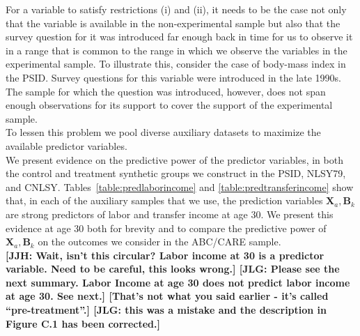 \noindent For a variable to satisfy restrictions (i) and (ii), it needs to be the case not only that the variable is available in the non-experimental sample but also that the survey question for it was introduced far enough back in time for us to observe it in a range that is common to the range in which we observe the variables in the experimental sample. To illustrate this, consider the case of body-mass index in the PSID. Survey questions for this variable were introduced in the late 1990s. The sample for which the question was introduced, however, does not span enough observations for its support to cover the support of the experimental sample.\\

\noindent To lessen this problem we pool diverse auxiliary datasets to maximize the available predictor variables.\\

\noindent We present evidence on the predictive power of the predictor variables, in both the control and treatment synthetic groups we construct in the PSID, NLSY79, and CNLSY. Tables~\ref{table:predlaborincome} and \ref{table:predtransferincome} show that, in each of the auxiliary samples that we use, the prediction variables $\bm{X}_{a}, \bm{B}_k$ are strong predictors of labor and transfer  income at age 30. We present this evidence at age 30 both for brevity and to compare the predictive power of $\bm{X}_{a},\bm{B}_k$ on the outcomes we consider in the ABC/CARE sample.\\

\textbf{[JJH: Wait, isn't this circular? Labor income at 30 is a predictor variable. Need to be careful, this looks wrong.] [JLG: Please see the next summary. Labor Income at age 30 does not predict labor income at age 30. See next.] [That's not what you said earlier - it's called ``pre-treatment''.] [JLG: this was a mistake and the description in Figure C.1 has been corrected.]}\\

